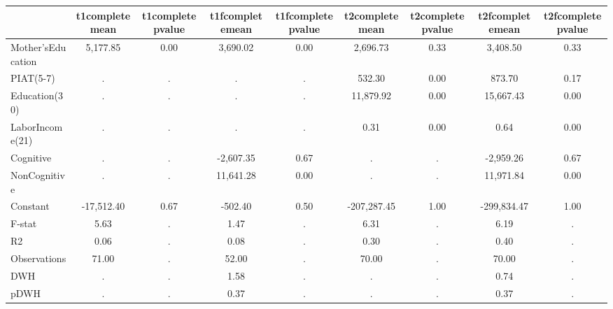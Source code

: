 \begin{table}[htbp]
\begin{tabular}{lcccccccc} \hline \hline
 & t1completemean  & t1completepvalue  & t1fcompletemean  & t1fcompletepvalue  & t2completemean  & t2completepvalue  & t2fcompletemean  & t2fcompletepvalue  \\  \hline 
Mother'sEducation &     5,177.85 &         0.00 &     3,690.02 &         0.00 &     2,696.73 &         0.33 &     3,408.50 &         0.33 \\  
PIAT(5-7) &            . &            . &            . &            . &       532.30 &         0.00 &       873.70 &         0.17 \\  
Education(30) &            . &            . &            . &            . &    11,879.92 &         0.00 &    15,667.43 &         0.00 \\  
LaborIncome(21) &            . &            . &            . &            . &         0.31 &         0.00 &         0.64 &         0.00 \\  
Cognitive &            . &            . &    -2,607.35 &         0.67 &            . &            . &    -2,959.26 &         0.67 \\  
NonCognitive &            . &            . &    11,641.28 &         0.00 &            . &            . &    11,971.84 &         0.00 \\  
Constant &   -17,512.40 &         0.67 &      -502.40 &         0.50 &  -207,287.45 &         1.00 &  -299,834.47 &         1.00 \\  
F-stat &         5.63 &            . &         1.47 &            . &         6.31 &            . &         6.19 &            . \\  
R2 &         0.06 &            . &         0.08 &            . &         0.30 &            . &         0.40 &            . \\  
Observations &        71.00 &            . &        52.00 &            . &        70.00 &            . &        70.00 &            . \\  
DWH &            . &            . &         1.58 &            . &            . &            . &         0.74 &            . \\  
pDWH &            . &            . &         0.37 &            . &            . &            . &         0.37 &            . \\  
\hline \hline \end{tabular}
\end{table}
